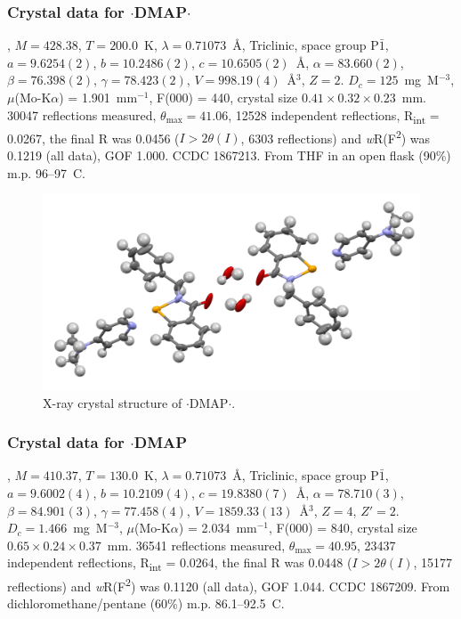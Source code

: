 \begin{refsection}
    \subsubsection{Crystal data for \texorpdfstring{$ \cdot $DMAP$ \cdot $}{C21H21N3OSe.(H2O)}}
    , $M=428.38$, $T=200.0$~K, $ \lambda=0.71073 $~\AA, Triclinic, space group P$\bar{1}$, $a = 9.6254(2)$, $b = 10.2486(2)$, $c = 10.6505(2)$~\AA, $\alpha = 83.660(2)$\degree, $\beta = 76.398(2)$\degree, $\gamma = 78.423(2)$\degree, $V = 998.19(4)$~\AA$^{3}$, $Z = 2$.
    $D_{c}= 125$~mg~M$^{-3}$, $\mu$(Mo-K$\alpha$) = 1.901~mm$^{-1}$, F(000) = 440, crystal size $0.41 \times 0.32 \times 0.23$~mm.
    30047 reflections measured, $\theta_{\max} = 41.06$\degree, 12528 independent reflections, R\textsubscript{int} = 0.0267, the final R was 0.0456 ($I > 2\theta(I)$, 6303 reflections) and \textit{w}R(F\textsuperscript{2}) was 0.1219 (all data), GOF 1.000.
    CCDC 1867213.
    From THF in an open flask (90\%) m.p. 96--97~\degree{}C.
    
    \begin{figure}
      \includegraphics[width=0.6\linewidth]{Figures/ebs-bn-dmap-hydrate-xtal.pdf}
      \caption{X-ray crystal structure of \texorpdfstring{$ \cdot $DMAP$ \cdot $}{C21H21N3OSe.(H2O)}.}
    \end{figure}
    
    \subsubsection{Crystal data for \texorpdfstring{$ \cdot $DMAP}{C21H21N3OSe}}
    , $M=410.37$, $T=130.0$~K, $ \lambda=0.71073 $~\AA, Triclinic, space group P$\bar{1}$, $a = 9.6002(4)$, $b = 10.2109(4)$, $c = 19.8380(7)$~\AA, $\alpha = 78.710(3)$\degree, $\beta = 84.901(3)$\degree, $\gamma = 77.458(4)$\degree, $V = 1859.33(13)$~\AA$^{3}$, $Z = 4$, $Z\prime = 2$.
    $D_{c}= 1.466$~mg~M$^{-3}$, $\mu$(Mo-K$\alpha$) = 2.034~mm$^{-1}$, F(000) = 840, crystal size $0.65 \times 0.24 \times 0.37$~mm.
    36541 reflections measured, $\theta_{\max} = 40.95$\degree, 23437 independent reflections, R\textsubscript{int} = 0.0264, the final R was 0.0448 ($I > 2\theta(I)$, 15177 reflections) and \textit{w}R(F\textsuperscript{2}) was 0.1120 (all data), GOF 1.044.
    CCDC 1867209.
    From dichloromethane/pentane (60\%) m.p. 86.1--92.5~\degree{}C.
    

\end{refsection}
